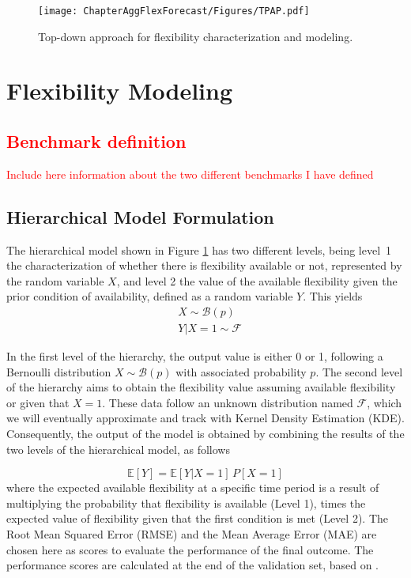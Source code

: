 \begin{figure}[]
\centerline{\texttt{[image: ChapterAggFlexForecast/Figures/TPAP.pdf]}}
\caption{Top-down approach for flexibility characterization and modeling.}
\label{fig:top_down}
\end{figure}

\section{Flexibility Modeling} \label{Sect:FlexModeling}

\textcolor{red}{\subsection{Benchmark definition}}

\textcolor{red}{Include here information about the two different benchmarks I have defined}

\subsection{Hierarchical Model Formulation}
The hierarchical model shown in Figure \ref{fig:top_down} has two different levels, being level~1 the characterization of whether there is flexibility available or not, represented by the random variable $X$, and level 2 the value of the available flexibility given the prior condition of availability, defined as a random variable $Y$. This yields
\begin{subequations}
\begin{align} 
\label{eq:hierarchicalpierre}
  & X \sim \mathcal{B}(p) \\
  & Y|X=1 \sim \mathcal{F}
\end{align}
\end{subequations}

In the first level of the hierarchy, the output value is either 0 or 1, following a Bernoulli distribution $X \sim \mathcal{B}(p)$ with associated probability $p$. The second level of the hierarchy aims to obtain the flexibility value assuming available flexibility or given that $X=1$. These data follow an unknown distribution named $\mathcal{F}$, which we will eventually approximate and track with Kernel Density Estimation (KDE). Consequently, the output of the model is obtained by combining the results of the two levels of the hierarchical model, as follows

\begin{equation} \label{eq:bernoulli}
  \mathbb{E}[Y] = \mathbb{E}[Y|X=1] \,  P[X=1]
\end{equation}
where the expected available flexibility at a specific time period is a result of multiplying the probability that flexibility is available (Level 1), times the expected value of flexibility given that the first condition is met (Level 2). The Root Mean Squared Error (RMSE) and the Mean Average Error (MAE) are chosen here as scores to evaluate the performance of the final outcome. The performance scores are calculated  at the end of the validation set, based on \cite{Hyndman2021}.

